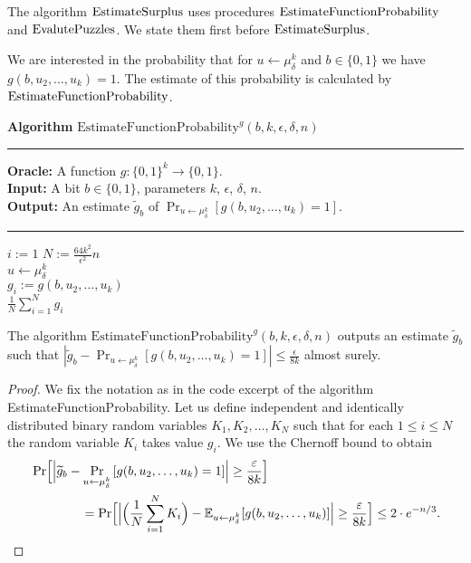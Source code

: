 The algorithm $\operatorname{\text{EstimateSurplus}}$ uses procedures $\operatorname{\text{EstimateFunctionProbability}}$ and $\operatorname{\text{EvalutePuzzles}}$.
We state them first before $\operatorname{\text{EstimateSurplus}}$.

We are interested in the probability that for $u \leftarrow \mu_{\delta}^k$ and $b \in \{0,1\}$ we have $g(b,u_2, \dotsc, u_k) = 1$.
The estimate of this probability is calculated by $\operatorname{\text{EstimateFunctionProbability}}$.
%
\begin{codeblock}
  \textbf{Algorithm} $\text{EstimateFunctionProbability}^{g}(b, k, \epsilon, \delta, n)$
  \medskip\hrule
  \textbf{Oracle:} A function $g : \{0,1\}^{k} \rightarrow \{0,1\}$.\\
  \textbf{Input:} A bit $b \in \{0,1\}$, parameters $k$, $\epsilon$, $\delta$, $n$. \\
  \textbf{Output:} An estimate $\widetilde{g}_b$ of $\Pr_{u \leftarrow \mu_{\delta}^{k}}[g(b,u_2, \dotsc, u_k) = 1]$.
  \medskip\hrule
  \For $i:=1$ \To $N := \frac{64k^2}{\epsilon^2} n$ \Do \\
  \IndI $u \leftarrow \mu_{\delta}^{k}$ \\
  \IndI $g_i := g(b, u_2, \dotsc, u_k)$ \\
  \Return $\frac{1}{N} \sum_{i=1}^{N} g_i$
\end{codeblock}
%
%
\begin{lemma}
  \label{lemma:estimate_of_g}
  The algorithm $\text{EstimateFunctionProbability}^{g}(b, k, \epsilon, \delta, n)$ outputs an estimate $\widetilde{g}_b$
  such that $| \widetilde{g}_b - \Pr_{u \leftarrow \mu_{\delta}^{k}}\left[g(b,u_2, \dots, u_k) = 1\right] | \leq \frac{\epsilon}{8k}$ almost surely.
\end{lemma}
%
\begin{proof}
We fix the notation as in the code excerpt of the algorithm EstimateFunctionProbability.
Let us define independent and identically distributed binary random variables $K_1, K_2, \dots, K_N$
such that for each $1 \leq i \leq N$ the random variable $K_i$ takes value $g_i$. We use the Chernoff bound to obtain
\begin{align*}
  &\Pr \Bigl[ \Bigl| \widetilde{g}_b - \Pr_{u \leftarrow \mu_{\delta}^{k}}\left[g(b,u_2, \dots, u_k) = 1\right] \Bigr| \geq \frac{\varepsilon}{8k} \Bigr]\\
  &\mbox\qquad\qquad = \Pr \Bigl[\Bigl|\Bigl(\frac{1}{N} \sum_{i=1}^N K_i \Bigr) - \mathbb{E}_{u \leftarrow \mu_{\delta}^k}[g(b,u_2, \dots, u_k)]\Bigr|
    \geq \frac{\varepsilon}{8k} \Bigr] \leq 2 \cdot e^{-n/3}.
\end{align*}
\end{proof}
